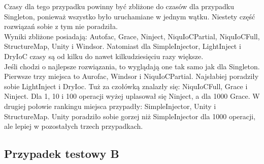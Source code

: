 \documentclass[12pt]{article}
\begin{document}
Czasy dla tego przypadku powinny być zbliżone do czasów dla przypadku Singleton, ponieważ wszystko było uruchamiane w jednym wątku. Niestety część rozwiązań sobie z tym nie poradziła.\\
Wyniki zbliżone posiadają: Autofac, Grace, Ninject, NiquIoCPartial, NiquIoCFull, StructureMap, Unity i Windsor. Natomiast dla SimpleInjector, LightInject i DryIoC czasy są od kilku do nawet kilkudziesięciu razy większe.\\
Jeśli chodzi o najlepsze rozwiązania, to wyglądają one tak samo jak dla Singleton. Pierwsze trzy miejsca to Aurofac, Windsor i NiquIoCPartial. Najsłabiej poradziły sobie LightInject i DryIoc. Tuż za czołówką znalazły się: NiquIoCFull, Grace i Ninject. Dla 1, 10 i 100 operacji wyżej uplasował się Ninject, a dla 1000 Grace. W drugiej połowie rankingu miejsca przypadły: SimpleInjector, Unity i StructureMap. Unity poradziło sobie gorzej niż SimpleInjector dla 1000 operacji, ale lepiej w pozostałych trzech przypadkach.


\subsection{Przypadek testowy B}
\end{document}

